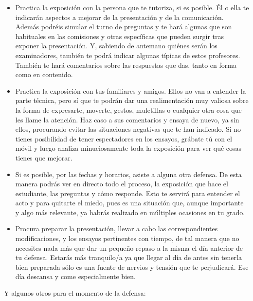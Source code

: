 \begin{itemize}
    \item Practica la exposición con la persona que te tutoriza, si es posible. Él o ella te indicarán aspectos a mejorar de la presentación y de la comunicación. Además podréis simular el turno de preguntas y te hará algunas que son habituales en las comisiones y otras específicas que pueden surgir tras exponer la presentación. Y, sabiendo de antemano quiénes serán los examinadores, también te podrá indicar algunas típicas de estos profesores. También te hará comentarios sobre las respuestas que das, tanto en forma como en contenido.

    \item Practica la exposición con tus familiares y amigos. Ellos no van a entender la parte técnica, pero sí que te podrán dar una realimentación muy valiosa sobre la forma de expresarte, moverte, gestos, muletillas o cualquier otra cosa que les llame la atención. Haz caso a sus comentarios y ensaya de nuevo, ya sin ellos, procurando evitar las situaciones negativas que te han indicado. Si no tienes posibilidad de tener espectadores en los ensayos, grábate tú con el móvil y luego analiza minuciosamente toda la exposición para ver qué cosas tienes que mejorar.

    \item Si es posible, por las fechas y horarios, asiste a alguna otra defensa. De esta manera podrás ver en directo todo el proceso, la exposición que hace el estudiante, las preguntas y cómo responde. Esto te servirá para entender el acto y para quitarte el miedo, pues es una situación que, aunque importante y algo más relevante, ya habrás realizado en múltiples ocasiones en tu grado.

    \item Procura preparar la presentación, llevar a cabo las correspondientes modificaciones, y los ensayos pertinentes con tiempo, de tal manera que no necesites nada más que dar un pequeño repaso a la misma el día anterior de tu defensa. Estarás más tranquilo/a ya que llegar al día de antes sin tenerla bien preparada sólo es una fuente de nervios y tensión que te perjudicará. Ese día descansa y come especialmente bien. 
    
\end{itemize}

Y algunos otros para el momento de la defensa:

